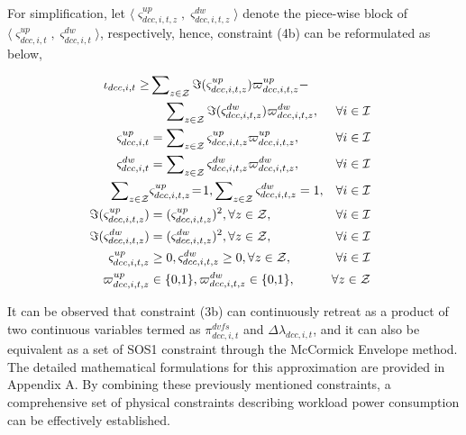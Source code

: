 \documentclass[lettersize,journal]{IEEEtran}
\begin{document}
For simplification, let $\langle \varsigma_{dcc,i,t,z}^{up}, \varsigma_{dcc,i,t,z}^{dw}\rangle$ denote the piece-wise block of $\langle \varsigma_{dcc,i,t}^{up},\varsigma_{dcc,i,t}^{dw}\rangle$, respectively, hence, constraint (4b) can be reformulated as below,

\vspace{-0.25cm}
\begin{subequations}
	\begin{align}
		\!\!\!\!\iota_{dcc,i,t} \geq            & \sum\nolimits_{z\in\mathcal{Z}} \Im(\varsigma_{dcc,i,t, z}^{up}) \varpi_{dcc,i,t, z}^{up} - \notag                                  \\
		                                        & \quad\, \sum\nolimits_{z\in\mathcal{Z}} \Im(\varsigma_{dcc,i,t, z}^{dw}) \varpi_{dcc,i,t, z}^{dw},       & \forall i\in \mathcal{I} \\
		\!\!\!\!\varsigma_{dcc,i,t}^{up}        & = \sum\nolimits_{z\in\mathcal{Z}} \varsigma_{dcc,i,t,z}^{up} \varpi_{dcc,i,t,z}^{up},                    & \forall i\in \mathcal{I} \\
		\!\!\!\!\varsigma_{dcc,i,t}^{dw}        & = \sum\nolimits_{z\in\mathcal{Z}} \varsigma_{dcc,i,t,z}^{dw} \varpi_{dcc,i,t,z}^{dw},                    & \forall i\in \mathcal{I} \\
		\!\!\!\!\sum\nolimits_{z\in\mathcal{Z}} & \varsigma_{dcc,i,t,z}^{up} \!=\! 1,  \sum\nolimits_{z\in\mathcal{Z}} \varsigma_{dcc,i,t,z}^{dw} = 1,\!\! & \forall i\in \mathcal{I} \\
		\!\!\!\!\Im(\varsigma_{dcc,i,t,z}^{up}) & = (\varsigma_{dcc,i,t,z}^{up})^2,  \forall z\in \mathcal{Z},                                             & \forall i\in \mathcal{I} \\
		\!\!\!\!\Im(\varsigma_{dcc,i,t,z}^{dw}) & = (\varsigma_{dcc,i,t,z}^{dw})^2,  \forall z\in \mathcal{Z},                                             & \forall i\in \mathcal{I} \\
		\!\!\!\!\varsigma_{dcc,i,t,z}^{up}      & \geq 0,\varsigma_{dcc,i,t,z}^{dw}  \geq 0, \forall z\in \mathcal{Z},                                     & \forall i\in \mathcal{I} \\
		\!\!\!\!\varpi_{dcc,i,t,z}^{up}         & \in\{0,\!1\},\varpi_{dcc,i,t,z}^{dw}\in\{0,\!1\},                                                        & \forall z\in \mathcal{Z}
	\end{align}
\end{subequations}

It can be observed that constraint (3b) can continuously retreat as a product of two continuous variables termed as \(\pi_{dcc,i,t}^{dvfs}\) and \(\varDelta \lambda_{dcc,i,t}\), and it can also be equivalent as a set of SOS1 constraint through the McCormick Envelope method. The detailed mathematical formulations for this approximation are provided in Appendix A. By combining these previously mentioned constraints, a comprehensive set of physical constraints describing workload power consumption can be effectively established.
\end{document}
